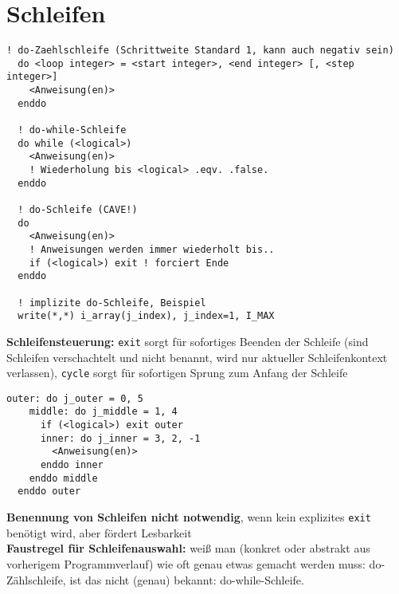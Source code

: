 \documentclass[a4paper, twocolumn]{scrarticle}
\begin{document}
\section{Schleifen}
\begin{lstlisting}[caption={\bfseries do-Schleifen}]
  ! do-Zaehlschleife (Schrittweite Standard 1, kann auch negativ sein)
  do <loop integer> = <start integer>, <end integer> [, <step integer>]
    <Anweisung(en)>
  enddo
  
  ! do-while-Schleife
  do while (<logical>)
    <Anweisung(en)>
    ! Wiederholung bis <logical> .eqv. .false.
  enddo
  
  ! do-Schleife (CAVE!)
  do
    <Anweisung(en)>
    ! Anweisungen werden immer wiederholt bis..
    if (<logical>) exit ! forciert Ende
  enddo
  
  ! implizite do-Schleife, Beispiel
  write(*,*) i_array(j_index), j_index=1, I_MAX
\end{lstlisting}
\textbf{Schleifensteuerung:} \lstinline|exit| sorgt für sofortiges Beenden der Schleife (sind Schleifen verschachtelt und nicht benannt, wird nur aktueller Schleifenkontext verlassen), \lstinline|cycle| sorgt für sofortigen Sprung zum Anfang der Schleife 
\begin{lstlisting}[caption={\bfseries Beispiel: Benannte do-Schleifen und explizites exit}]
  outer: do j_outer = 0, 5
    middle: do j_middle = 1, 4
      if (<logical>) exit outer
      inner: do j_inner = 3, 2, -1
        <Anweisung(en)>
      enddo inner
    enddo middle
  enddo outer
\end{lstlisting}
\textbf{Benennung von Schleifen nicht notwendig}, wenn kein explizites \lstinline|exit| benötigt wird, aber fördert Lesbarkeit\\
\textbf{Faustregel für Schleifenauswahl:} weiß man (konkret oder abstrakt aus vorherigem Programmverlauf) wie oft genau etwas gemacht werden muss: do-Zählschleife, ist das nicht (genau) bekannt: do-while-Schleife.
\end{document}
